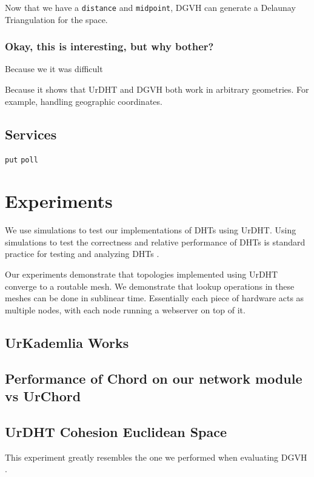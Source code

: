 \documentclass[11pt,conference]{IEEEtran}
\begin{document}
Now that we have a \texttt{distance} and \texttt{midpoint}, DGVH can generate a Delaunay Triangulation for the space.


\subsubsection{Okay, this is interesting, but why bother?}
Because we it was difficult

Because it shows that UrDHT and DGVH both work in arbitrary geometries.
For example, handling geographic coordinates. 


\subsection{Services}
\texttt{put}  \texttt{poll}
	
\section{Experiments}
\label{sec:experiments}

We use simulations to test our implementations of DHTs using UrDHT.
Using simulations to test the correctness and relative performance of DHTs is standard practice for testing and analyzing DHTs \cite{kademlia} \cite{chord} \cite{tapestry} \cite{symphony} \cite{raynet} \cite{li2005comparing}.

Our experiments demonstrate that topologies implemented using UrDHT converge to a routable mesh.
We demonstrate that lookup operations in these meshes can be done in sublinear time.
Essentially each piece of hardware acts as multiple nodes, with each node running a webserver on top of it.



\subsection{UrKademlia Works}

\subsection{Performance of Chord on our network module vs UrChord}

\subsection{UrDHT Cohesion Euclidean Space}
This experiment greatly resembles the one we performed when evaluating DGVH \cite{dgvh}.
\end{document}
